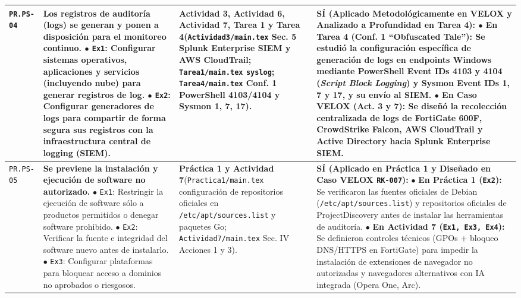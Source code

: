 \documentclass[letterpaper,11pt]{article}
\begin{document}
\begin{longtable}{|C{1.5cm}|L{5.3cm}|L{4.3cm}|L{5.8cm}|}
\texttt{PR.PS-04} &
\textbf{Los registros de auditoría (logs) se generan y ponen a disposición para el monitoreo continuo.}\newline
$\bullet$ \texttt{Ex1}: Configurar sistemas operativos, aplicaciones y servicios (incluyendo nube) para generar registros de log.\newline
$\bullet$ \texttt{Ex2}: Configurar generadores de logs para compartir de forma segura sus registros con la infraestructura central de logging (SIEM). &
\textbf{Actividad 3, Actividad 6, Actividad 7, Tarea 1 y Tarea 4}\newline (\texttt{Actividad3/main.tex} Sec. 5 Splunk Enterprise SIEM y AWS CloudTrail; \texttt{Tarea1/main.tex} \texttt{syslog}; \texttt{Tarea4/main.tex} Conf. 1 PowerShell 4103/4104 y Sysmon 1, 7, 17). &
\textbf{SÍ (Aplicado Metodológicamente en VELOX y Analizado a Profundidad en Tarea 4):}\newline
$\bullet$ \textbf{En Tarea 4 (Conf. 1 ``Obfuscated Tale''):} Se estudió la configuración específica de generación de logs en endpoints Windows mediante \textbf{PowerShell Event IDs 4103 y 4104} (\textit{Script Block Logging}) y \textbf{Sysmon Event IDs 1, 7 y 17}, y su envío al SIEM.\newline
$\bullet$ \textbf{En Caso VELOX (Act. 3 y 7):} Se diseñó la recolección centralizada de logs de FortiGate 600F, CrowdStrike Falcon, AWS CloudTrail y Active Directory hacia \textbf{Splunk Enterprise SIEM}. \\
\hline

\texttt{PR.PS-05} &
\textbf{Se previene la instalación y ejecución de software no autorizado.}\newline
$\bullet$ \texttt{Ex1}: Restringir la ejecución de software sólo a productos permitidos o denegar software prohibido.\newline
$\bullet$ \texttt{Ex2}: Verificar la fuente e integridad del software nuevo antes de instalarlo.\newline
$\bullet$ \texttt{Ex3}: Configurar plataformas para bloquear acceso a dominios no aprobados o riesgosos. &
\textbf{Práctica 1 y Actividad 7}\newline (\texttt{Practica1/main.tex} configuración de repositorios oficiales en \texttt{/etc/apt/sources.list} y paquetes Go; \texttt{Actividad7/main.tex} Sec. IV Acciones 1 y 3). &
\textbf{SÍ (Aplicado en Práctica 1 y Diseñado en Caso VELOX \texttt{RK-007}):}\newline
$\bullet$ \textbf{En Práctica 1 (\texttt{Ex2}):} Se verificaron las fuentes oficiales de Debian (\texttt{/etc/apt/sources.list}) y repositorios oficiales de ProjectDiscovery antes de instalar las herramientas de auditoría.\newline
$\bullet$ \textbf{En Actividad 7 (\texttt{Ex1, Ex3, Ex4}):} Se definieron controles técnicos (GPOs + bloqueo DNS/HTTPS en FortiGate) para impedir la instalación de extensiones de navegador no autorizadas y navegadores alternativos con IA integrada (Opera One, Arc). \\
\hline


\end{longtable}
\end{document}
